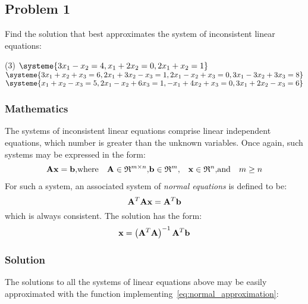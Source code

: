 \subsection{Problem 1}%
\label{sec:problem_1}
Find the solution that best approximates the system of inconsistent linear equations:
\begin{tasks}(3)
  \task $\systeme{3x_1-x_2=4,x_1+2x_2=0,2x_1+x_2=1}$
  \task $\systeme{3x_1+x_2+x_3=6,
  2x_1+3x_2-x_3=1,
  2x_1-x_2+x_3=0,
  3x_1-3x_2+3x_3=8}$
  \task $\systeme{x_1+x_2-x_3=5,
  2x_1-x_2+6x_3=1,
  -x_1+4x_2+x_3=0,
  3x_1+2x_2-x_3=6}$
\end{tasks}
\subsubsection*{Mathematics}
The systems of inconsistent linear equations comprise linear independent equations,
which number is greater than the unknown variables.
Once again, such systems may be expressed in the form:
\begin{align*}
  \mathbf{Ax}=\mathbf{b}, & \text{where} &
  \mathbf{A}\in\mathfrak{R}^{m\times{}n}, &
  \mathbf{b}\in\mathfrak{R}^m, &
  \mathbf{x}\in\mathfrak{R}^n, & \text{and} & m\geq{}n
\end{align*}
For such a system, an associated system of \textit{normal equations} is defined to be:
\begin{equation}
  \mathbf{A}^T\mathbf{Ax}=\mathbf{A}^T\mathbf{b}
\end{equation}
which is always consistent.
The solution has the form:
\begin{equation}
  \label{eq:normal_approximation}
  \mathbf{x}=\left(\mathbf{A}^T\mathbf{A}\right)^{-1}\mathbf{A}^T\mathbf{b}
\end{equation}
\subsubsection*{Solution}
The solutions to all the systems of linear equations above may be easily approximated
with the \MATLAB{} function implementing~\eqref{eq:normal_approximation}:

